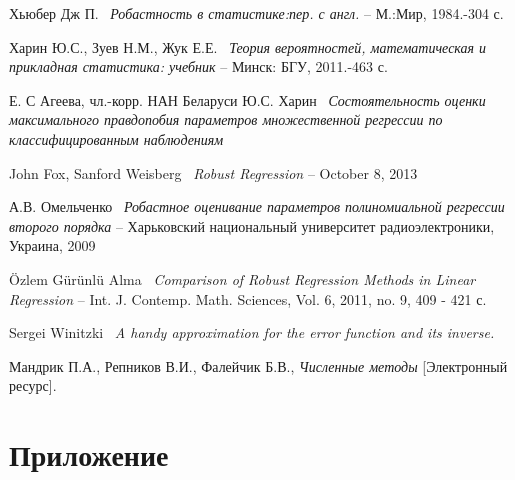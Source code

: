\documentclass[a4paper,14pt]{extarticle}
\begin{document}
\newpage
\begin{thebibliography}{8}
    Хьюбер Дж П.~
    \textit{Робастность в статистике:пер. с англ.} --
    М.:Мир, 1984.-304 с.

    Харин Ю.С., Зуев Н.М.,
    Жук Е.Е.~
    \textit{Теория вероятностей, математическая и прикладная статистика: учебник} --
    Минск: БГУ, 2011.-463 с.

    

    Е. С Агеева, чл.-корр. НАН Беларуси Ю.С. Харин~
    \textit{Состоятельность оценки максимального правдопобия параметров множественной регрессии по классифицированным наблюдениям}

    John Fox, Sanford Weisberg~
    \textit{Robust Regression} --
    October 8, 2013

    А.В. Омельченко~
    \textit{Робастное оценивание параметров полиномиальной регрессии второго порядка} --
    Харьковский национальный университет радиоэлектроники, Украина, 2009

    \"{O}zlem G\"{u}r\"{u}nl\"{u} Alma~
    \textit{Comparison of Robust Regression Methods
    in Linear Regression} -- 
    Int. J. Contemp. Math. Sciences, Vol. 6, 2011, no. 9, 409 - 421 с.

    Sergei Winitzki~
    \textit{A handy approximation for the error function and its inverse.}

    Мандрик П.А., Репников В.И., Фалейчик Б.В.,
    \textit{Численные методы} [Электронный ресурс].
\end{thebibliography}

\newpage


\section*{Приложение}
{}
\end{document}
